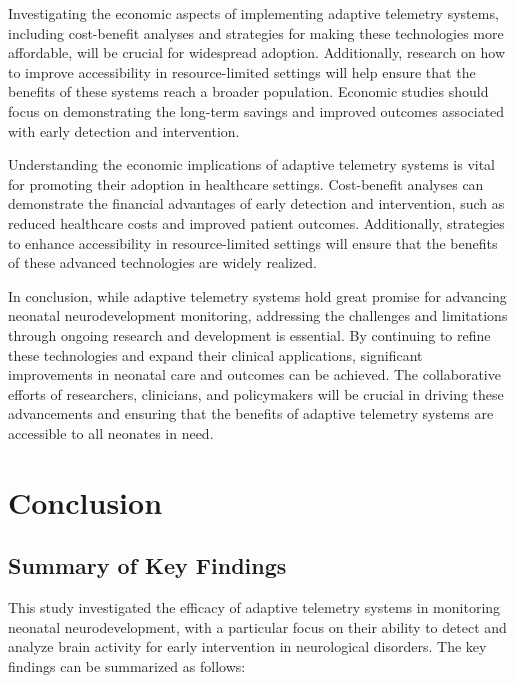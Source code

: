 \documentclass[12pt,journal,compsoc]{IEEEtran}
\begin{document}
Investigating the economic aspects of implementing adaptive telemetry systems, including cost-benefit analyses and strategies for making these technologies more affordable, will be crucial for widespread adoption. Additionally, research on how to improve accessibility in resource-limited settings will help ensure that the benefits of these systems reach a broader population. Economic studies should focus on demonstrating the long-term savings and improved outcomes associated with early detection and intervention.

Understanding the economic implications of adaptive telemetry systems is vital for promoting their adoption in healthcare settings. Cost-benefit analyses can demonstrate the financial advantages of early detection and intervention, such as reduced healthcare costs and improved patient outcomes. Additionally, strategies to enhance accessibility in resource-limited settings will ensure that the benefits of these advanced technologies are widely realized.

In conclusion, while adaptive telemetry systems hold great promise for advancing neonatal neurodevelopment monitoring, addressing the challenges and limitations through ongoing research and development is essential. By continuing to refine these technologies and expand their clinical applications, significant improvements in neonatal care and outcomes can be achieved. The collaborative efforts of researchers, clinicians, and policymakers will be crucial in driving these advancements and ensuring that the benefits of adaptive telemetry systems are accessible to all neonates in need.


\section{Conclusion}

\subsection{Summary of Key Findings}

This study investigated the efficacy of adaptive telemetry systems in monitoring neonatal neurodevelopment, with a particular focus on their ability to detect and analyze brain activity for early intervention in neurological disorders. The key findings can be summarized as follows:
\end{document}
